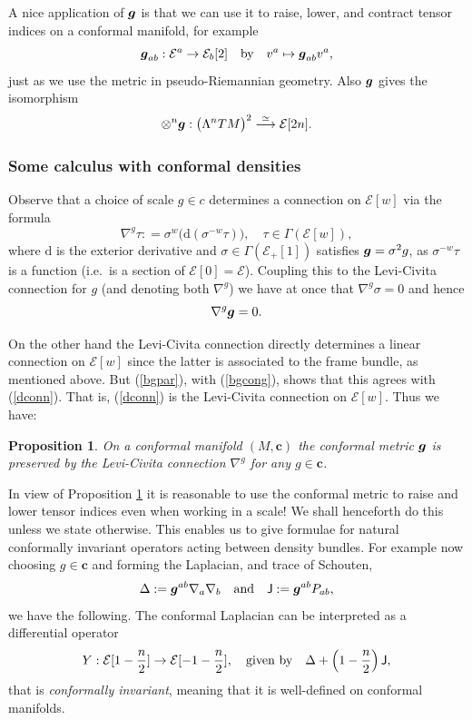\documentclass[a4paper,12pt]{amsart}
\def\Cal{\mathcal}
\newcommand{\J}{\mbox{\sf J}}
\newcommand{\cc}{\boldsymbol{c}}
\newcommand{\ce}{{\Cal E}}
\def\bg{\mbox{\boldmath $g$}}
\newcommand{\si}{\sigma}
\newtheorem{proposition}[theorem]{Proposition}
\theoremstyle{remark}
\newcommand{\nn}[1]{(\ref{#1})}
\begin{document}
A nice application of $\bg$ is that we can use it to raise, lower,
and contract tensor indices on a conformal manifold, for example
$$
\bg_{ab}:\ce^a\to \ce_b[2] \quad \mbox{by}\quad v^a\mapsto \bg_{ab}v^a, 
$$ just as we use the metric in pseudo-Riemannian geometry. 
Also $\bg$ gives the isomorphism 
\begin{equation}\label{bgcong}
\otimes^n \bg: \big( \Lambda^n TM \big)^2\stackrel{\simeq}{\longrightarrow}\ce[2n].
\end{equation}


\subsubsection{Some calculus with conformal densities}\label{dcalc}

Observe that a choice of scale $g\in c$ determines a connection on
$\ce[w]$ via the formula
\begin{equation}\label{dconn}
\nabla^g \tau : = \si^w \big( \mathrm{d} (\si^{-w} \tau) \big), \quad \tau\in \Gamma(\ce[w]) ,
\end{equation}
where $\mathrm{d}$ is the exterior derivative and $\si\in \Gamma(\ce_+[1])$
satisfies $\bg=\si^2 g$, as $\si^{-w} \tau$ is a function (i.e.\ is
a section of $\ce[0]=\ce$).  Coupling this to the Levi-Civita connection
for $g$ (and denoting both $\nabla^g$) we have at once that $\nabla^g
\si=0$ and hence 
\begin{equation}\label{bgpar}
\nabla^g \bg=0.
\end{equation}


On the other hand the Levi-Civita connection directly determines a
linear connection on $\ce[w]$ since the latter is associated to the
frame bundle, as mentioned above. But \nn{bgpar}, with \nn{bgcong},
shows that this agrees with \nn{dconn}. That is, \nn{dconn} is the
Levi-Civita connection on $\ce[w]$. Thus we have:
\begin{proposition}\label{bgparprop} On a conformal manifold $(M,\cc)$ 
the conformal metric $\bg$ is preserved by the Levi-Civita connection
$\nabla^g$ for any $g\in \cc$.
\end{proposition}

In view of  Proposition \ref{bgparprop} it is reasonable to
use the conformal metric to raise and lower tensor indices even when
working in a scale! We shall henceforth do this unless we state otherwise. 
This enables us to give formulae for natural
conformally invariant operators acting between density bundles. For example 
now choosing $g\in \cc$ and forming the Laplacian, and trace of Schouten,   
$$
\Delta:= \bg^{ab}\nabla_a\nabla_b \quad\mbox{and}\quad \J:=\bg^{ab} P_{ab} ,
$$
we have the following. The  conformal Laplacian can be interpreted as a  differential operator
$$
Y:\ce[1-\frac{n}{2}]\to \ce[-1-\frac{n}{2}], \quad\mbox{given by}\quad 
\Delta+\left(1-\frac{n}{2}\right)\J ,
$$
that is {\em conformally invariant}, meaning that it is well-defined on conformal manifolds.
\end{document}
